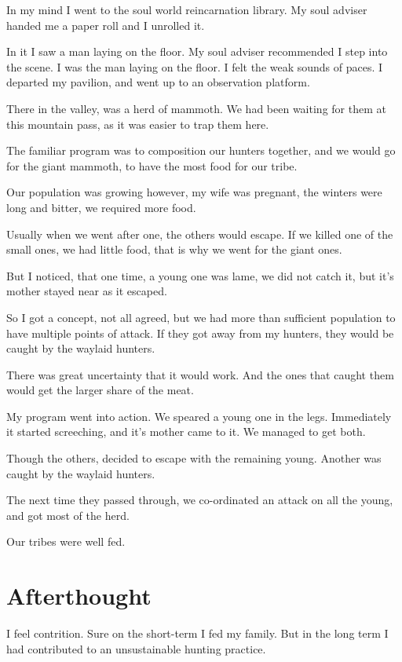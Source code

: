 In my mind I went to the soul world reincarnation library. My soul adviser
handed me a paper roll and I unrolled it.

In it I saw a man laying on the floor. My soul adviser recommended I step into
the scene. I was the man laying on the floor. I felt the weak sounds of
paces. I departed my pavilion, and went up to an observation platform.

There in the valley, was a herd of mammoth. We had been waiting for them at this
mountain pass, as it was easier to trap them here. 

The familiar program was to composition our hunters together, and we would go for
the giant mammoth, to have the most food for our tribe. 

Our population was growing however, my wife was pregnant, the winters were long
 and bitter, we required more food.

Usually when we went after one, the others would escape. 
If we killed one of the small ones, we had little food,
that is why we went for the giant ones. 

But I noticed, that one time, a young one was lame, we did not catch it, but
it's mother stayed near as it escaped. 

So I got a concept, not all agreed, but we had more than sufficient population 
to have multiple points of attack. If they got away from my hunters, they would 
be caught by the waylaid hunters. 

There was great uncertainty that it would work. And the ones that caught them
would get the larger share of the meat. 

My program went into action. We speared a young one in the legs.
Immediately it started screeching, and it's mother came to it. 
We managed to get both.

Though the others, decided to escape with the remaining young. Another was
caught by the waylaid hunters.

The next time they passed through, we co-ordinated an attack on all the young, 
and got most of the herd. 

Our tribes were well fed. 

\section{Afterthought}

I feel contrition. Sure on the short-term I fed my family. But in the long term
I had contributed to an unsustainable hunting practice. 

